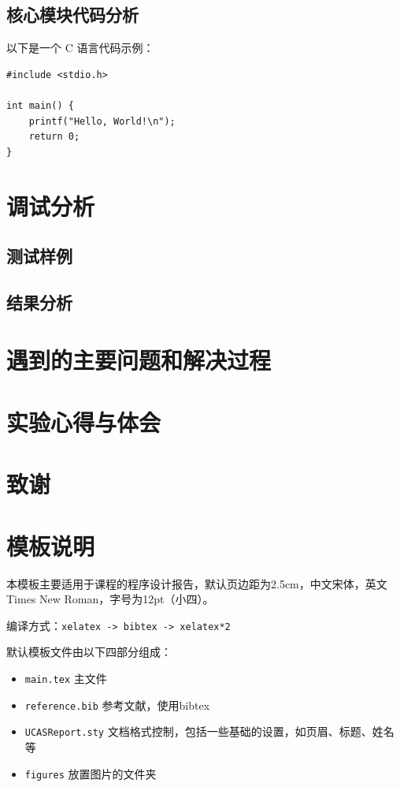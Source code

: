 \documentclass[12pt,hyperref,a4paper,UTF8]{ctexart}
\begin{document}
\subsection{核心模块代码分析}

以下是一个 C 语言代码示例：

\begin{verbatim}
#include <stdio.h>

int main() {
    printf("Hello, World!\n");
    return 0;
}
\end{verbatim}
\section{调试分析}
\subsection{测试样例}
\subsection{结果分析}
\section{遇到的主要问题和解决过程}
\section{实验心得与体会}
\section{致谢}


\section{模板说明}
本模板主要适用于课程的程序设计报告，默认页边距为2.5cm，中文宋体，英文Times New Roman，字号为12pt（小四）。

编译方式：\verb|xelatex -> bibtex -> xelatex*2|


默认模板文件由以下四部分组成：
\begin{itemize}
    \item \texttt{main.tex} 主文件
    \item \texttt{reference.bib} 参考文献，使用bibtex
    \item \texttt{UCASReport.sty} 文档格式控制，包括一些基础的设置，如页眉、标题、姓名等
    \item \texttt{figures} 放置图片的文件夹
\end{itemize}
\end{document}
